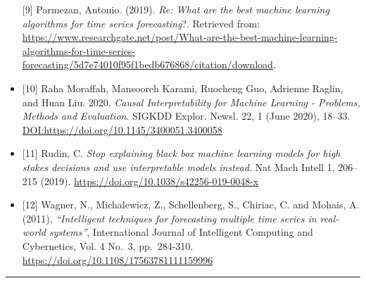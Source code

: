 \documentclass[
  12pt,
]{article}
\begin{document}
\begin{itemize}
  \protect\hypertarget{9}{}{{[}9{]}} Parmezan, Antonio. (2019).
  \emph{Re: What are the best machine learning algorithms for time
  series forecasting}?. Retrieved from:
  \url{https://www.researchgate.net/post/What-are-the-best-machine-learning-algorithms-for-time-series-forecasting/5d7e74010f95f1bedb676868/citation/download}.
\item
  \protect\hypertarget{10}{}{{[}10{]}} Raha Moraffah, Mansooreh Karami,
  Ruocheng Guo, Adrienne Raglin, and Huan Liu. 2020. \emph{Causal
  Interpretability for Machine Learning - Problems, Methods and
  Evaluation}. SIGKDD Explor. Newsl. 22, 1 (June 2020), 18--33.
  \url{DOI:https://doi.org/10.1145/3400051.3400058}
\item
  \protect\hypertarget{11}{}{{[}11{]}} Rudin, C. \emph{Stop explaining
  black box machine learning models for high stakes decisions and use
  interpretable models instead}. Nat Mach Intell 1, 206--215 (2019).
  \url{https://doi.org/10.1038/s42256-019-0048-x}
\item
  \protect\hypertarget{12}{}{{[}12{]}} Wagner, N., Michalewicz, Z.,
  Schellenberg, S., Chiriac, C. and Mohais, A. (2011),
  \emph{``Intelligent techniques for forecasting multiple time series in
  real‐world systems''}, International Journal of Intelligent Computing
  and Cybernetics, Vol. 4 No.~3, pp.~284-310.
  \url{https://doi.org/10.1108/17563781111159996}
\end{itemize}

\begin{center}\rule{0.5\linewidth}{0.5pt}\end{center}
\end{document}
